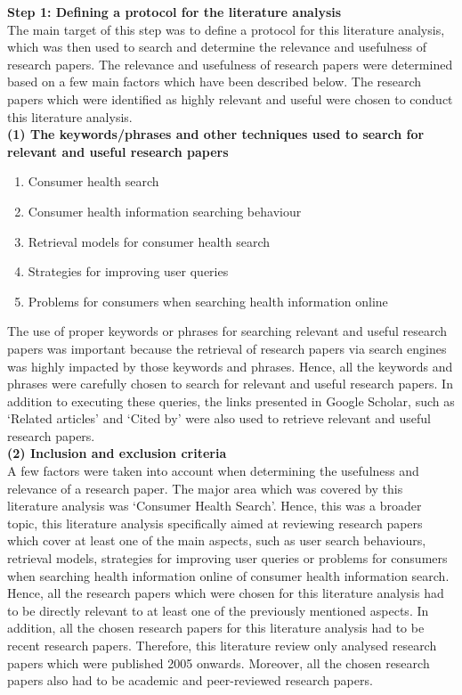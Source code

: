 \documentclass[]{article}
\begin{document}
\textbf{Step 1: Defining a protocol for the literature analysis}\\
	
The main target of this step was to define a protocol \cite{knopf2006doing} for this literature analysis, which was then used to search and determine the relevance and usefulness of research papers. The relevance and usefulness of research papers were determined based on a few main factors which have been described below. The research papers which were identified as highly relevant and useful were chosen to conduct this literature analysis.\\ 
	
\textbf{(1)	The keywords/phrases and other techniques used to search for relevant and useful research papers }


\begin{enumerate}	
	\item Consumer health search
	\item Consumer health information searching behaviour
	\item Retrieval models for consumer health search
	\item Strategies for improving user queries
	\item Problems for consumers when searching health information online	
\end{enumerate}	

	
The use of proper keywords or phrases for searching relevant and useful research papers was important because the retrieval of research papers via search engines was highly impacted by those keywords and phrases. Hence, all the keywords and phrases were carefully chosen to search for relevant and useful research papers. In addition to executing these queries, the links presented in Google Scholar, such as ‘Related articles’ and ‘Cited by’ were also used to retrieve relevant and useful research papers.\\
	
\textbf{(2)	Inclusion and exclusion criteria}\\ 
	
A few factors were taken into account when determining the usefulness and relevance of a research paper. The major area which was covered by this literature analysis was ‘Consumer Health Search’. Hence, this was a broader topic, this literature analysis specifically aimed at reviewing research papers which cover at least one of the main aspects, such as user search behaviours, retrieval models, strategies for improving user queries or problems for consumers when searching health information online of consumer health information search. Hence, all the research papers which were chosen for this literature analysis had to be directly relevant to at least one of the previously mentioned aspects. In addition, all the chosen research papers for this literature analysis had to be recent research papers. Therefore, this literature review only analysed research papers which were published 2005 onwards. Moreover, all the chosen research papers also had to be academic and peer-reviewed research papers.\\ 
	
\end{document}
